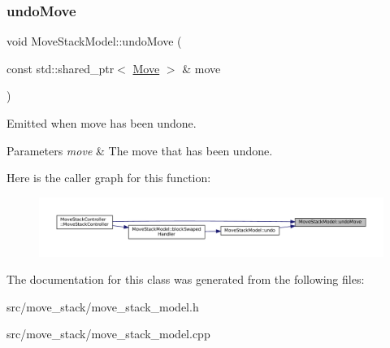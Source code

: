 \subsubsection{\texorpdfstring{undoMove}{undoMove}}
{\footnotesize\ttfamily void Move\+Stack\+Model\+::undo\+Move (\begin{DoxyParamCaption}\item[{const std\+::shared\+\_\+ptr$<$ \mbox{\hyperlink{struct_move}{Move}} $>$ \&}]{move }\end{DoxyParamCaption})\hspace{0.3cm}{\ttfamily [signal]}}



Emitted when move has been undone. 


\begin{DoxyParams}{Parameters}
{\em move} & The move that has been undone. \\
\hline
\end{DoxyParams}
Here is the caller graph for this function\+:
\nopagebreak
\begin{figure}[H]
\begin{center}
\leavevmode
\includegraphics[width=350pt]{class_move_stack_model_a16436cf5acda5455355c24f28586f1e8_icgraph}
\end{center}
\end{figure}


The documentation for this class was generated from the following files\+:\begin{DoxyCompactItemize}
\item 
src/move\+\_\+stack/move\+\_\+stack\+\_\+model.\+h\item 
src/move\+\_\+stack/move\+\_\+stack\+\_\+model.\+cpp\end{DoxyCompactItemize}

